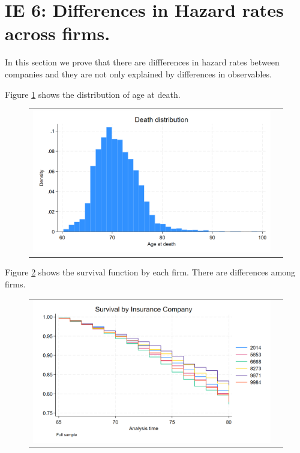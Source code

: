 \documentclass[12pt]{article}
\begin{document}
\section{IE 6: Differences in Hazard rates across firms. }

In this section we prove that there are diffferences in hazard rates between companies and they are not only explained by differences in observables. 


Figure \ref{fig:ie6_1} shows the distribution of age at death. 


\begin{figure}[H]
\caption{}
\label{fig:ie6_1}
\centering{}%
\begin{tabular}{cc}
\includegraphics[scale=0.27]{../figures/IE6/IE6_hist_dies.png} 
\end{tabular}
\end{figure}

Figure \ref{fig:ie6_2} shows the survival function by each firm. There are differences among firms. 
\begin{figure}[H]
\caption{}
\label{fig:ie6_2}
\centering{}%
\begin{tabular}{cc}
\includegraphics[scale=0.27]{../figures/IE6/IE6_survival_year_all.png} 
\end{tabular}
\end{figure}
\end{document}
